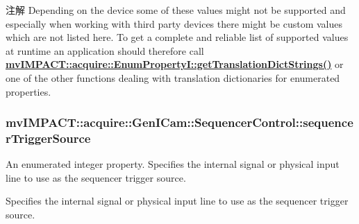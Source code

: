 \begin{DoxyNote}{注解}
Depending on the device some of these values might not be supported and especially when working with third party devices there might be custom values which are not listed here. To get a complete and reliable list of supported values at runtime an application should therefore call {\bfseries \hyperlink{classmv_i_m_p_a_c_t_1_1acquire_1_1_enum_property_i_a0ba6ccbf5ee69784d5d0b537924d26b6}{mv\+I\+M\+P\+A\+C\+T\+::acquire\+::\+Enum\+Property\+I\+::get\+Translation\+Dict\+Strings()}} or one of the other functions dealing with translation dictionaries for enumerated properties. 
\end{DoxyNote}
\hypertarget{classmv_i_m_p_a_c_t_1_1acquire_1_1_gen_i_cam_1_1_sequencer_control_a9ae04765c395a9ffdbdbcd8232ebbed2}{
\subsubsection[{sequencer\+Trigger\+Source}]{ mv\+I\+M\+P\+A\+C\+T\+::acquire\+::\+Gen\+I\+Cam\+::\+Sequencer\+Control\+::sequencer\+Trigger\+Source}}\label{classmv_i_m_p_a_c_t_1_1acquire_1_1_gen_i_cam_1_1_sequencer_control_a9ae04765c395a9ffdbdbcd8232ebbed2}


An enumerated integer property. Specifies the internal signal or physical input line to use as the sequencer trigger source. 

Specifies the internal signal or physical input line to use as the sequencer trigger source.

